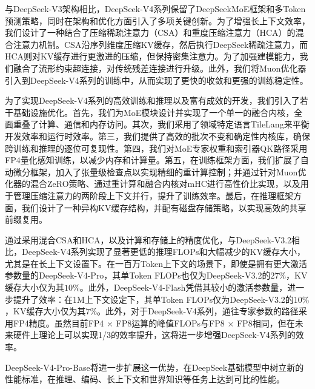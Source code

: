 \documentclass[11pt,a4paper]{article}
\newcommand{\dsvfour}{DeepSeek-V4}
\newcommand{\dsvfourpro}{DeepSeek-V4-Pro}
\newcommand{\dsvfourflash}{DeepSeek-V4-Flash}
\newcommand{\dsvthree}{DeepSeek-V3}
\newcommand{\dsvthreetwo}{DeepSeek-V3.2}
\newcommand{\moe}{MoE}
\begin{document}
与\dsvthree 架构相比，\dsvfour 系列保留了DeepSeekMoE框架和多Token预测策略，同时在架构和优化方面引入了多项关键创新。为了增强长上下文效率，我们设计了一种结合了压缩稀疏注意力（CSA）和重度压缩注意力（HCA）的混合注意力机制。CSA沿序列维度压缩KV缓存，然后执行DeepSeek稀疏注意力，而HCA则对KV缓存进行更激进的压缩，但保持密集注意力。为了加强建模能力，我们融合了流形约束超连接，对传统残差连接进行升级。此外，我们将Muon优化器引入到\dsvfour 系列的训练中，从而实现了更快的收敛和更强的训练稳定性。

为了实现\dsvfour 系列的高效训练和推理以及富有成效的开发，我们引入了若干基础设施优化。首先，我们为\moe{}模块设计并实现了一个单一的融合内核，全面重叠了计算、通信和内存访问。其次，我们采用了领域特定语言TileLang来平衡开发效率和运行时效率。第三，我们提供了高效的批次不变和确定性内核库，确保跨训练和推理的逐位可复现性。第四，我们对\moe{}专家权重和索引器QK路径采用FP4量化感知训练，以减少内存和计算量。第五，在训练框架方面，我们扩展了自动微分框架，加入了张量级检查点以实现精细的重计算控制；并通过针对Muon优化器的混合ZeRO策略、通过重计算和融合内核对mHC进行高性价比实现，以及用于管理压缩注意力的两阶段上下文并行，提升了训练效率。最后，在推理框架方面，我们设计了一种异构KV缓存结构，并配有磁盘存储策略，以实现高效的共享前缀复用。

通过采用混合CSA和HCA，以及计算和存储上的精度优化，与\dsvthreetwo 相比，\dsvfour 系列实现了显著更低的推理FLOPs和大幅减少的KV缓存大小，尤其是在长上下文设置下。在一百万Token上下文的场景下，即使是拥有更大激活参数量的\dsvfourpro，其单Token FLOPs也仅为\dsvthreetwo 的\(27\%\)，KV缓存大小仅为其\(10\%\)。此外，\dsvfourflash 凭借其较小的激活参数量，进一步提升了效率：在1M上下文设定下，其单Token FLOPs仅为\dsvthreetwo 的\(10\%\)，KV缓存大小仅为其\(7\%\)。此外，对于\dsvfour 系列，通往专家参数的路径采用FP4精度。虽然目前FP4 × FP8运算的峰值FLOPs与FP8 × FP8相同，但在未来硬件上理论上可以实现1/3的效率提升，这将进一步增强\dsvfour 系列的效率。

\dsvfour-Pro-Base将进一步扩展这一优势，在DeepSeek基础模型中树立新的性能标准，在推理、编码、长上下文和世界知识等任务上达到可比的性能。
\end{document}
